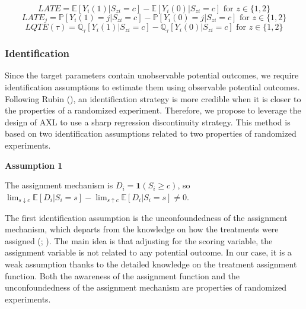 \documentclass[
  11pt]{article}
\begin{document}
\[
LATE = \mathbb{E}[Y_i(1)|S_{zi}=c] - \mathbb{E}[Y_i(0)|S_{zi}=c] \text{ for } z \in \{1, 2\}
\] \[
LATE_j = \mathbb{P}[Y_i(1)=j|S_{zi}=c] - \mathbb{P}[Y_i(0)=j|S_{zi}=c] \text{ for } z \in \{1, 2\}
\] \[
LQTE(\tau) = \mathbb{Q}_{\tau}[Y_i(1)|S_{zi}=c] - \mathbb{Q}_{\tau}[Y_i(0)|S_{zi}=c] \text{ for } z \in \{1, 2\}
\]

\subsubsection{Identification}\label{identification}

Since the target parameters contain unobservable potential outcomes, we
require identification assumptions to estimate them using observable
potential outcomes. Following Rubin (), an
identification strategy is more credible when it is closer to the
properties of a randomized experiment. Therefore, we propose to leverage
the design of AXL to use a sharp regression discontinuity strategy. This
method is based on two identification assumptions related to two
properties of randomized experiments.

\begin{tcolorbox}[enhanced jigsaw, breakable, leftrule=.75mm, arc=.35mm, left=2mm, colback=white, rightrule=.15mm, colframe=quarto-callout-tip-color-frame, toprule=.15mm, bottomrule=.15mm, opacityback=0]

\vspace{-3mm}\textbf{Assumption 1}\vspace{3mm}

The assignment mechanism is \(D_i = \mathbf{1}(S_i \ge c)\), so
\(\lim_{s \downarrow c} \mathbb{E}[D_i|S_i=s] - \lim_{s \uparrow c} \mathbb{E}[D_i|S_i=s] \ne 0\).

\end{tcolorbox}

The first identification assumption is the unconfoundedness of the
assignment mechanism, which departs from the knowledge on how the
treatments were assigned (; ). The main idea is that adjusting for the scoring variable, the
assignment variable is not related to any potential outcome. In our
case, it is a weak assumption thanks to the detailed knowledge on the
treatment assignment function. Both the awareness of the assignment
function and the unconfoundedness of the assignment mechanism are
properties of randomized experiments.
\end{document}
